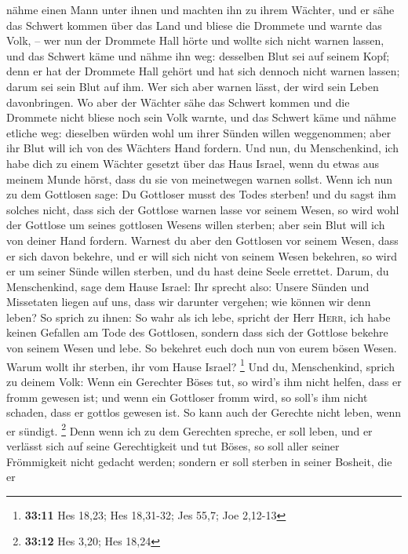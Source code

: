 nähme einen Mann unter ihnen und machten ihn zu ihrem Wächter,
 und er sähe das Schwert kommen über das Land und bliese
die Drommete und warnte das Volk, --  wer nun der Drommete
Hall hörte und wollte sich nicht warnen lassen, und das Schwert käme und
nähme ihn weg: desselben Blut sei auf seinem Kopf;  denn
er hat der Drommete Hall gehört und hat sich dennoch nicht warnen
lassen; darum sei sein Blut auf ihm. Wer sich aber warnen lässt, der
wird sein Leben davonbringen.  Wo aber der Wächter sähe
das Schwert kommen und die Drommete nicht bliese noch sein Volk warnte,
und das Schwert käme und nähme etliche weg: dieselben würden wohl um
ihrer Sünden willen weggenommen; aber ihr Blut will ich von des Wächters
Hand fordern.  Und nun, du Menschenkind, ich habe dich zu
einem Wächter gesetzt über das Haus Israel, wenn du etwas aus meinem
Munde hörst, dass du sie von meinetwegen warnen sollst. 
Wenn ich nun zu dem Gottlosen sage: Du Gottloser musst des Todes
sterben! und du sagst ihm solches nicht, dass sich der Gottlose warnen
lasse vor seinem Wesen, so wird wohl der Gottlose um seines gottlosen
Wesens willen sterben; aber sein Blut will ich von deiner Hand fordern.
 Warnest du aber den Gottlosen vor seinem Wesen, dass er
sich davon bekehre, und er will sich nicht von seinem Wesen bekehren, so
wird er um seiner Sünde willen sterben, und du hast deine Seele
errettet.  Darum, du Menschenkind, sage dem Hause Israel:
Ihr sprecht also: Unsere Sünden und Missetaten liegen auf uns, dass wir
darunter vergehen; wie können wir denn leben?  So sprich
zu ihnen: So wahr als ich lebe, spricht der Herr \textsc{Herr}, ich habe
keinen Gefallen am Tode des Gottlosen, sondern dass sich der Gottlose
bekehre von seinem Wesen und lebe. So bekehret euch doch nun von eurem
bösen Wesen. Warum wollt ihr sterben, ihr vom Hause Israel? \footnote{\textbf{33:11}
  Hes 18,23; Hes 18,31-32; Jes 55,7; Joe 2,12-13}  Und
du, Menschenkind, sprich zu deinem Volk: Wenn ein Gerechter Böses tut,
so wird's ihm nicht helfen, dass er fromm gewesen ist; und wenn ein
Gottloser fromm wird, so soll's ihm nicht schaden, dass er gottlos
gewesen ist. So kann auch der Gerechte nicht leben, wenn er sündigt.
\footnote{\textbf{33:12} Hes 3,20; Hes 18,24}  Denn wenn
ich zu dem Gerechten spreche, er soll leben, und er verlässt sich auf
seine Gerechtigkeit und tut Böses, so soll aller seiner Frömmigkeit
nicht gedacht werden; sondern er soll sterben in seiner Bosheit, die er
